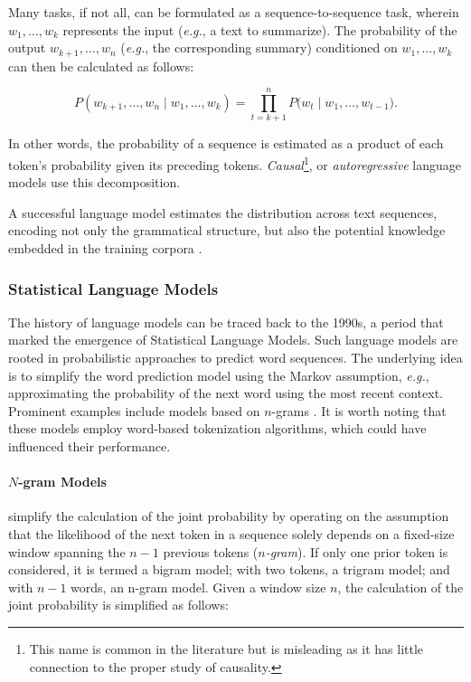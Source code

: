 
Many tasks, if not all, can be formulated as a sequence-to-sequence task, wherein $w_1, \ldots, w_k$ represents the input (\textit{e.g.}, a text to summarize). The probability of the output $w_{k+1}, \ldots, w_n$ (\textit{e.g.}, the corresponding summary) conditioned on $w_1, \ldots, w_k$ can then be calculated as follows:

\begin{equation}
    P(w_{k+1}, \ldots, w_n \mid w_1, \ldots, w_k) = \prod_{t=k+1}^{n} P\bigl(w_t \mid w_1, \ldots, w_{t-1}\bigr).
\label{equation:causal-distribution-generalization}
\end{equation}


In other words, the probability of a sequence is estimated as a product of each token's probability given its preceding tokens. \textit{Causal}\footnote{This name is common in the literature but is misleading as it has little connection to the proper study of causality.}, or \textit{autoregressive} language models use this decomposition.

A successful language model estimates the distribution across text sequences, encoding not only the grammatical structure, but also the potential knowledge embedded in the training corpora \citep{jozefowicz2016exploring}.

\subsubsection{Statistical Language Models} The history of language models can be traced back to the 1990s, a period that marked the emergence of Statistical Language Models. Such language models are rooted in probabilistic approaches to predict word sequences. The underlying idea is to simplify the word prediction model using the Markov assumption, \textit{e.g.}, approximating the probability of the next word using the most recent context. Prominent examples include models based on $n$-grams \citep{brown1992class, omar2018arabic}. It is worth noting that these models employ word-based tokenization algorithms, which could have influenced their performance.

\paragraph{$N$-gram Models} simplify the calculation of the joint probability by operating on the assumption that the likelihood of the next token in a sequence solely depends on a fixed-size window spanning the $n-1$ previous tokens (\textit{$n$-gram}). If only one prior token is considered, it is termed a bigram model; with two tokens, a trigram model; and with $n-1$ words, an n-gram model. Given a window size $n$, the calculation of the joint probability is simplified as follows:

